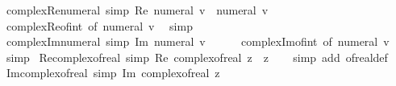 \begin{isabellebody}
\isanewline
%
\endisadelimproof
\isanewline
{}\isamarkupfalse%
\ complex{\isacharunderscore}{\kern0pt}Re{\isacharunderscore}{\kern0pt}numeral\ {\isacharbrackleft}{\kern0pt}simp{\isacharbrackright}{\kern0pt}{\isacharcolon}{\kern0pt}\ {\isachardoublequoteopen}Re\ {\isacharparenleft}{\kern0pt}numeral\ v{\isacharparenright}{\kern0pt}\ {\isacharequal}{\kern0pt}\ numeral\ v{\isachardoublequoteclose}\isanewline
%
\isadelimproof
\ \ %
\endisadelimproof
%
\isatagproof
{}\isamarkupfalse%
\ complex{\isacharunderscore}{\kern0pt}Re{\isacharunderscore}{\kern0pt}of{\isacharunderscore}{\kern0pt}int\ {\isacharbrackleft}{\kern0pt}of\ {\isachardoublequoteopen}numeral\ v{\isachardoublequoteclose}{\isacharbrackright}{\kern0pt}\ \isamarkupfalse%
\ simp%
\endisatagproof
{\isafoldproof}%
%
\isadelimproof
\isanewline
%
\endisadelimproof
\isanewline
{}\isamarkupfalse%
\ complex{\isacharunderscore}{\kern0pt}Im{\isacharunderscore}{\kern0pt}numeral\ {\isacharbrackleft}{\kern0pt}simp{\isacharbrackright}{\kern0pt}{\isacharcolon}{\kern0pt}\ {\isachardoublequoteopen}Im\ {\isacharparenleft}{\kern0pt}numeral\ v{\isacharparenright}{\kern0pt}\ {\isacharequal}{\kern0pt}\ {}{\isachardoublequoteclose}\isanewline
%
\isadelimproof
\ \ %
\endisadelimproof
%
\isatagproof
{}\isamarkupfalse%
\ complex{\isacharunderscore}{\kern0pt}Im{\isacharunderscore}{\kern0pt}of{\isacharunderscore}{\kern0pt}int\ {\isacharbrackleft}{\kern0pt}of\ {\isachardoublequoteopen}numeral\ v{\isachardoublequoteclose}{\isacharbrackright}{\kern0pt}\ \isamarkupfalse%
\ simp%
\endisatagproof
{\isafoldproof}%
%
\isadelimproof
\isanewline
%
\endisadelimproof
\isanewline
{}\isamarkupfalse%
\ Re{\isacharunderscore}{\kern0pt}complex{\isacharunderscore}{\kern0pt}of{\isacharunderscore}{\kern0pt}real\ {\isacharbrackleft}{\kern0pt}simp{\isacharbrackright}{\kern0pt}{\isacharcolon}{\kern0pt}\ {\isachardoublequoteopen}Re\ {\isacharparenleft}{\kern0pt}complex{\isacharunderscore}{\kern0pt}of{\isacharunderscore}{\kern0pt}real\ z{\isacharparenright}{\kern0pt}\ {\isacharequal}{\kern0pt}\ z{\isachardoublequoteclose}\isanewline
%
\isadelimproof
\ \ %
\endisadelimproof
%
\isatagproof
{}\isamarkupfalse%
\ {\isacharparenleft}{\kern0pt}simp\ add{\isacharcolon}{\kern0pt}\ of{\isacharunderscore}{\kern0pt}real{\isacharunderscore}{\kern0pt}def{\isacharparenright}{\kern0pt}%
\endisatagproof
{\isafoldproof}%
%
\isadelimproof
\isanewline
%
\endisadelimproof
\isanewline
{}\isamarkupfalse%
\ Im{\isacharunderscore}{\kern0pt}complex{\isacharunderscore}{\kern0pt}of{\isacharunderscore}{\kern0pt}real\ {\isacharbrackleft}{\kern0pt}simp{\isacharbrackright}{\kern0pt}{\isacharcolon}{\kern0pt}\ {\isachardoublequoteopen}Im\ {\isacharparenleft}{\kern0pt}complex{\isacharunderscore}{\kern0pt}of{\isacharunderscore}{\kern0pt}real\ z{\isacharparenright}{\kern0pt}\ {\isacharequal}{\kern0pt}\ {}{\isachardoublequoteclose}\isanewline

\end{isabellebody}
